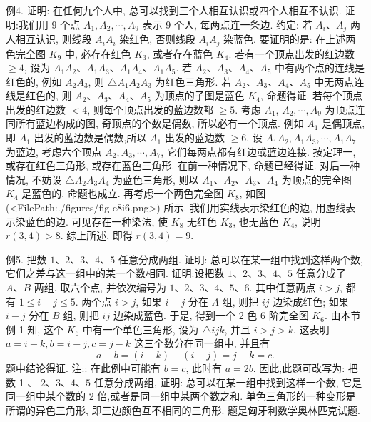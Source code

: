 例4. 证明: 在任何九个人中, 总可以找到三个人相互认识或四个人相互不认识.
证明:我们用 9 个点 $A_1, A_2, \cdots, A_9$ 表示 9 个人, 每两点连一条边.
约定: 若 $A_i 、 A_j$ 两人相互认识, 则线段 $A_i A_i$ 染红色, 否则线段 $A_i A_j$ 染蓝色.
要证明的是: 在上述两色完全图 $K_9$ 中, 必存在红色 $K_3$, 或者存在蓝色 $K_4$.
若有一个顶点出发的红边数 $\geqslant 4$, 设为 $A_1 A_2 、 A_1 A_3 、 A_1 A_4 、 A_1 A_5$. 若 $A_2 、 A_3 、 A_4 、 A_5$ 中有两个点的连线是红色的, 例如 $A_2 A_3$, 则 $\triangle A_1 A_2 A_3$ 为红色三角形.
若 $A_2 、 A_3 、 A_4 、 A_5$ 中无两点连线是红色的, 则 $A_2 、 A_3 、 A_4 、 A_5$ 为顶点的子图是蓝色 $K_4$, 命题得证.
若每个顶点出发的红边数 $<4$, 则每个顶点出发的蓝边数都 $\geqslant 5$. 考虑 $A_1$, $A_2, \cdots, A_9$ 为顶点连同所有蓝边构成的图, 奇顶点的个数是偶数, 所以必有一个顶点.
例如 $A_1$ 是偶顶点, 即 $A_1$ 出发的蓝边数是偶数,所以 $A_1$ 出发的蓝边数 $\geqslant 6$. 设 $A_1 A_2, A_1 A_3, \cdots, A_1 A_7$ 为蓝边, 考虑六个顶点 $A_2, A_3, \cdots, A_7$, 它们每两点都有红边或蓝边连接.
按定理一, 或存在红色三角形, 或存在蓝色三角形.
在前一种情况下, 命题已经得证.
对后一种情况, 不妨设 $\triangle A_2 A_3 A_4$ 为蓝色三角形, 则以 $A_1 、 A_2 、 A_3 、 A_4$ 为顶点的完全图 $K_4$ 是蓝色的.
命题也成立.
再考虑一个两色完全图 $K_8$, 如图(<FilePath:./figures/fig-c8i6.png>) 所示.
我们用实线表示染红色的边, 用虚线表示染蓝色的边.
可见存在一种染法, 使 $K_8$ 无红色 $K_3$, 也无蓝色 $K_4$, 说明 $r(3,4)>8$.
综上所述, 即得 $r(3,4)=9$.



例5. 把数 $1 、 2 、 3 、 4 、 5$ 任意分成两组.
证明: 总可以在某一组中找到这样两个数,它们之差与这一组中的某一个数相同.
证明:设把数 $1 、 2 、 3 、 4 、 5$ 任意分成了 $A 、 B$ 两组.
取六个点, 并依次编号为 $1 、 2 、 3 、 4 、 5 、 6$. 其中任意两点 $i>j$, 都有 $1 \leqslant i-j \leqslant 5$. 两个点 $i>j$, 如果 $i-j$ 分在 $A$ 组, 则把 $i j$ 边染成红色; 如果 $i-j$ 分在 $B$ 组, 则把 $i j$ 边染成蓝色.
于是, 得到一个 2 色 6 阶完全图 $K_6$. 由本节例 1 知, 这个 $K_6$ 中有一个单色三角形, 设为 $\triangle i j k$, 并且 $i>j>k$. 这表明 $a=i-k, b=i-j, c=j-k$
这三个数分在同一组中, 并且有
$$
a-b=(i-k)-(i-j)=j-k=c .
$$
题中结论得证.
注:: 在此例中可能有 $b=c$, 此时有 $a=2 b$. 因此,此题可改写为: 把数 1 、 $2 、 3 、 4 、 5$ 任意分成两组, 证明: 总可以在某一组中找到这样一个数, 它是同一组中某个数的 2 倍,或者是同一组中某两个数之和.
单色三角形的一种变形是所谓的异色三角形, 即三边颜色互不相同的三角形.
题是匈牙利数学奥林匹克试题.



